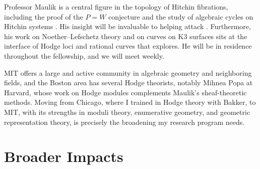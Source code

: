 \documentclass[11pt]{article}
\theoremstyle{compact}
\begin{document}
Professor Maulik is a central figure in the topology
of Hitchin fibrations, including the proof of the $P=W$ conjecture
\cite{dCMS22,maulik-shen24} and the study of algebraic cycles on Hitchin systems
\cite{msy-cycles}. His insight will be invaluable to helping attack . 
Furthermore, his work on Noether--Lefschetz theory
\cite{maulik-pandharipande13,kmps10} and on curves on K3 surfaces \cite{mpt10} sits 
at the interface of Hodge loci and rational curves that  explores.
He will be in residence throughout the fellowship, and we will meet weekly.

MIT offers a large and active community in algebraic geometry and neighboring fields, and
the Boston area has several Hodge theorists, notably Mihnea Popa at
Harvard, whose work on Hodge modules complements Maulik's sheaf-theoretic methods.
Moving from Chicago, where I trained in Hodge theory with Bakker, to MIT, with its strengths
in moduli theory, enumerative geometry, and geometric representation theory, is precisely
the broadening my research program needs.

\section{Broader Impacts}\label{sec:bi}


\end{document}
